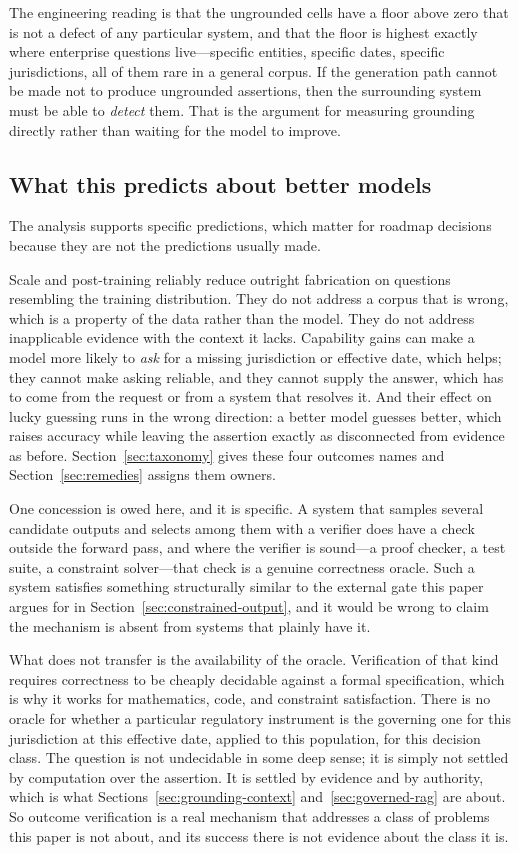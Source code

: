 \documentclass[11pt]{article}
\theoremstyle{plain}
\theoremstyle{definition}
\begin{document}
The engineering reading is that the ungrounded cells have a floor above zero that
is not a defect of any particular system, and that the floor is highest exactly
where enterprise questions live---specific entities, specific dates, specific
jurisdictions, all of them rare in a general corpus. If the generation path cannot
be made not to produce ungrounded assertions, then the surrounding system must be
able to \emph{detect} them. That is the argument for measuring grounding directly
rather than waiting for the model to improve.

\subsection{What this predicts about better models}
\label{sec:better-models}

The analysis supports specific predictions, which matter for roadmap decisions
because they are not the predictions usually made.

Scale and post-training reliably reduce outright fabrication on questions
resembling the training distribution. They do not address a corpus that is wrong,
which is a property of the data rather than the model. They do not address
inapplicable evidence with the context it lacks. Capability gains can make a model
more likely to \emph{ask} for a missing jurisdiction or effective date, which helps;
they cannot make asking reliable, and they cannot supply the answer, which has to come
from the request or from a system that resolves it. And their effect on lucky
guessing runs in the wrong direction: a better model guesses better, which raises
accuracy while leaving the assertion exactly as disconnected from evidence as
before. Section~\ref{sec:taxonomy} gives these four outcomes names and
Section~\ref{sec:remedies} assigns them owners.

One concession is owed here, and it is specific. A system that samples several
candidate outputs and selects among them with a verifier does have a check outside the
forward pass, and where the verifier is sound---a proof checker, a test suite, a
constraint solver---that check is a genuine correctness oracle. Such a system satisfies
something structurally similar to the external gate this paper argues for in
Section~\ref{sec:constrained-output}, and it would be wrong to claim the mechanism is
absent from systems that plainly have it.

What does not transfer is the availability of the oracle. Verification of that kind
requires correctness to be cheaply decidable against a formal specification, which is
why it works for mathematics, code, and constraint satisfaction. There is no oracle
for whether a particular regulatory instrument is the governing one for this
jurisdiction at this effective date, applied to this population, for this decision
class. The question is not undecidable in some deep sense; it is simply not settled by
computation over the assertion. It is settled by evidence and by authority, which is
what Sections~\ref{sec:grounding-context} and~\ref{sec:governed-rag} are about. So
outcome verification is a real mechanism that addresses a class of problems this paper
is not about, and its success there is not evidence about the class it is.
\end{document}
